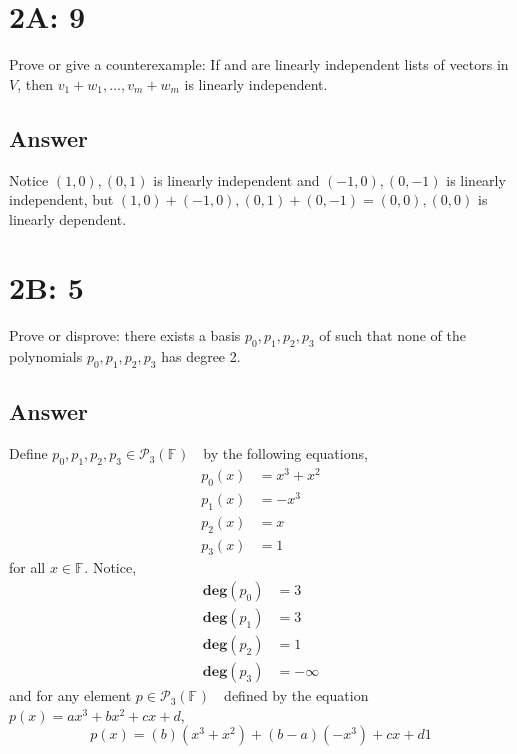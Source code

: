 \documentclass[
	12pt, %
]{fphw}
\newcommand\F[1]{\text{$\mathbb{F}^{#1}$}}
\newcommand\ls[2]{\text{$#1_1, \ldots, #1_{#2}$}}
\newcommand\poly[1]{\text{$\mathcal{P}_{#1}(\F{})$ }}
\renewcommand\deg[1]{\textbf{deg$(#1)$}}
\begin{document}

\section*{2A: 9}

\begin{problem}
Prove or give a counterexample: If \ls{v}{m} and \ls{w}{m} are linearly independent lists of vectors in $V$, then $v_1 + w_1, \ldots, v_m + w_m$ is linearly independent.

\end{problem}


\subsection*{Answer} Notice $(1, 0), (0, 1)$ is linearly independent and $(-1, 0), (0, -1)$ is linearly independent, but $(1, 0)+(-1, 0), (0, 1)+(0, -1) = (0,0),(0,0)$ is linearly dependent.\\


\newpage

\section*{2B: 5}

\begin{problem}
Prove or disprove: there exists a basis $p_0, p_1, p_2, p_3$ of \poly{3} such that none of the polynomials $p_0, p_1, p_2, p_3$ has degree 2.

\end{problem}


\subsection*{Answer} Define $p_0, p_1, p_2, p_3 \in \poly{3}$ by the following equations,
\begin{align*}
p_0(x) &= x^3 + x^2\\
p_1(x) &= -x^3\\
p_2(x) &= x\\
p_3(x) &= 1
\end{align*}
for all $x \in \F{}$.
Notice,
\begin{align*}
\deg{p_0} &= 3\\
\deg{p_1} &= 3\\
\deg{p_2} &= 1\\
\deg{p_3} &= -\infty
\end{align*}
and for any element $p \in \poly{3}$ defined by the equation $p(x) = ax^3 + bx^2 + cx + d$,
$$
p(x) = (b)(x^3 + x^2) + (b-a)(-x^3) +  cx + d1
$$
\end{document}
